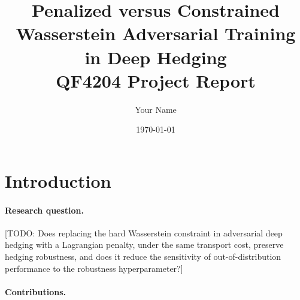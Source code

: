 \documentclass[11pt]{article}
\title{Penalized versus Constrained Wasserstein Adversarial Training\\in Deep Hedging\\[4pt]\large QF4204 Project Report}
\author{Your Name}
\date{\today}
\newif\ifshowguides
\newcommand{\guide}[1]{\ifshowguides
  \par\smallskip\noindent\fcolorbox{gray!50}{gray!6}{\parbox{\dimexpr\linewidth-2\fboxsep-2\fboxrule}{\small\itshape\color{gray!80!black}#1}}\par\smallskip\fi}
\newcommand{\todo}[1]{\textcolor{red!70!black}{[TODO: #1]}}
\newcommand{\Ups}{\Upsilon}
\begin{document}
\maketitle

\begin{abstract}
\guide{Write LAST, 150--200 words: (1) deep hedges are fragile to model misspecification;
(2) \cite{he2025} train against the worst case in a Wasserstein ball of fixed radius $\delta$ and
report sensitivity to $\delta$; (3) we replace the hard constraint by a Lagrangian penalty
$\lambda$ with the same transport cost; (4) headline findings in numbers: matched performance,
sensitivity of out-of-distribution risk to $\lambda$ vs.\ $\delta$, cross-robustness.}
\end{abstract}

\section{Introduction}\label{sec:intro}
\guide{About 1 page. (a) Deep hedging \cite{buehler2019} learns hedges from simulated paths and
inherits simulator error. (b) Robust deep hedging: parameter uncertainty \cite{lss2022};
Wasserstein adversarial training \cite{he2025}, the strongest recent result. (c) Their stated
limitation: performance depends on the radius $\delta$, which may differ across models.
(d) Penalized Wasserstein DRO \cite{sinha2018} is the Lagrangian counterpart of the constrained
problem; with a fixed penalty the effective radius adapts to the model during training.
(e) Research question and contributions.}

\paragraph{Research question.}
\todo{Does replacing the hard Wasserstein constraint in adversarial deep hedging with a Lagrangian
penalty, under the same transport cost, preserve hedging robustness, and does it reduce the
sensitivity of out-of-distribution performance to the robustness hyperparameter?}

\paragraph{Contributions.}\mbox{}
\guide{Keep checkable, one-to-one with \cref{sec:results}:
(1) a penalized adversary for deep hedging with exactly the geometry of \cite{he2025}'s attack,
so only constraint vs.\ penalty differs;
(2) a first-order calibration $\lambda(\delta)=\Ups/(2\delta)$ from \cite{bartl2021} that matches
the two formulations' strength;
(3) a controlled comparison of in- and out-of-distribution CVaR, sensitivity to the
hyperparameter, and cross-robustness. Claim ``to our knowledge'' novelty only after checking
\cite{he2025}'s related work.}
\end{document}

